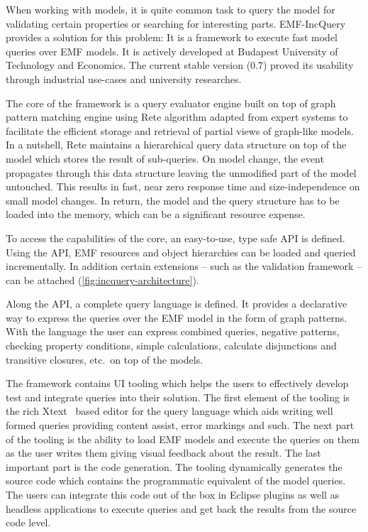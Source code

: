  
\cite{icmt2011} 

When working with models, it is quite common task to query the model for validating certain properties or searching for interesting parts. EMF-IncQuery \cite{EMFIncQuery} provides a solution for this problem: It is a framework to execute fast model queries over EMF models. It is actively developed at Budapest University of Technology and Economics. The current stable version (0.7) proved its usability through industrial use-cases and university researches.

The core of the framework is a query evaluator engine built on top of graph pattern matching engine using Rete algorithm adapted from expert systems to facilitate the efficient storage and retrieval of partial views of graph-like models. In a nutshell, Rete maintains a hierarchical query data structure on top of the model which stores the result of sub-queries. On model change, the event propagates through this data structure leaving the unmodified part of the model untouched. This results in fast, near zero response time and size-independence on small model changes. In return, the model and the query structure has to be loaded into the memory, which can be a significant resource expense.

To access the capabilities of the core, an easy-to-use, type safe API is defined. Using the API, EMF resources and object hierarchies can be loaded and queried incrementally. In addition certain extensions -- such as the validation
framework -- can be attached (\autoref{fig:incquery-architecture}). 

Along the API, a complete query language is defined. It provides a declarative way to express the queries over the EMF model in the form of graph patterns. With the language the user can express combined queries, negative patterns, checking property conditions, simple calculations, calculate disjunctions and transitive closures, etc.~on top of the models.

The framework contains UI tooling which helps the users to effectively develop test and integrate queries into their solution. The first element of the tooling is the rich Xtext~\cite{XtextWeb} based editor for the query language which aids writing well formed queries providing content assist, error markings and such. The next part of the tooling is the ability to load EMF models and execute the queries on them as the user writes them giving visual feedback about the result. The last important part is the code generation. The tooling dynamically generates the source code which contains the programmatic equivalent of the model queries. The users can integrate this code out of the box in Eclipse
plugins as well as headless applications to execute queries and get back the results from the source code level.


